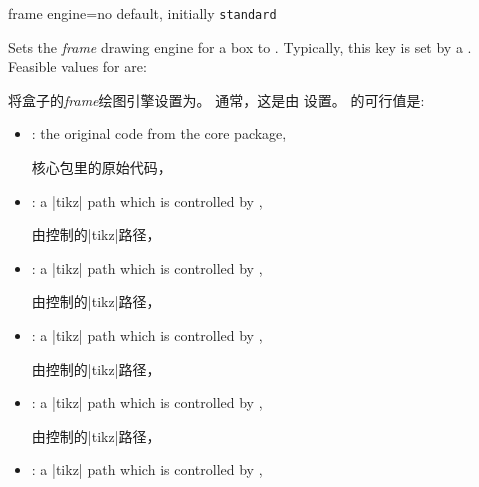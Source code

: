\begin{docTcbKey}{frame engine}{=}{no default, initially \texttt{standard}}

Sets the \emph{frame} drawing engine for a box to .
Typically, this key is set by a .
Feasible values for  are:

将盒子的\emph{frame}绘图引擎设置为。
通常，这是由  设置。
的可行值是:


\begin{itemize}
  \item{}: 
the original code from the core package,

核心包里的原始代码，

  
  \item{}: 
a |tikz| path which is controlled by ,

由控制的|tikz|路径，

  \item{}:
a |tikz| path which is controlled by ,

由控制的|tikz|路径，

  \item{}:
a |tikz| path which is controlled by ,

由控制的|tikz|路径，

  \item{}: 
a |tikz| path which is controlled by ,

由控制的|tikz|路径，

  \item{}:
a |tikz| path which is controlled by ,


\end{itemize}
\end{docTcbKey}
